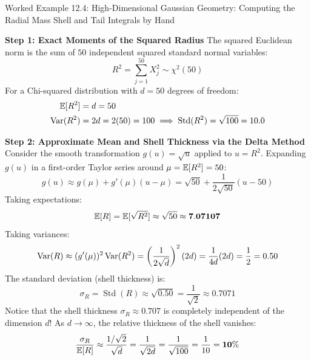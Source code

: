 \begin{examplebox}[breakable]{Worked Example 12.4: High-Dimensional Gaussian Geometry: Computing the Radial Mass Shell and Tail Integrals by Hand}
\tcblower

\textbf{Step 1: Exact Moments of the Squared Radius}
The squared Euclidean norm is the sum of $50$ independent squared standard normal variables:
\begin{equation}
R^2 = \sum_{j=1}^{50} X_j^2 \sim \chi^2(50)
\end{equation}
For a Chi-squared distribution with $d = 50$ degrees of freedom:
\begin{align}
\operatorname{\mathbb{E}}[R^2] &= d = 50 \\
\operatorname{Var}(R^2) &= 2d = 2(50) = 100 \implies \operatorname{Std}(R^2) = \sqrt{100} = 10.0
\end{align}

\textbf{Step 2: Approximate Mean and Shell Thickness via the Delta Method}
Consider the smooth transformation $g(u) = \sqrt{u}$ applied to $u = R^2$.
Expanding $g(u)$ in a first-order Taylor series around $\mu = \operatorname{\mathbb{E}}[R^2] = 50$:
\begin{equation}
g(u) \approx g(\mu) + g'(\mu)(u - \mu) = \sqrt{50} + \frac{1}{2\sqrt{50}}(u - 50)
\end{equation}
Taking expectations:
\begin{equation}
\operatorname{\mathbb{E}}[R] = \operatorname{\mathbb{E}}[\sqrt{R^2}] \approx \sqrt{50} \approx \mathbf{7.07107}
\end{equation}
Taking variances:
\begin{equation}
\operatorname{Var}(R) \approx (g'(\mu))^2 \operatorname{Var}(R^2) = \left( \frac{1}{2\sqrt{d}} \right)^2 (2d) = \frac{1}{4d}(2d) = \frac{1}{2} = 0.50
\end{equation}
The standard deviation (shell thickness) is:
\begin{equation}
\sigma_R = \operatorname{Std}(R) \approx \sqrt{0.50} = \frac{1}{\sqrt{2}} \approx \mathbf{0.7071}
\end{equation}
Notice that the shell thickness $\sigma_R \approx 0.707$ is completely independent of the dimension $d$!
As $d \to \infty$, the relative thickness of the shell vanishes:
\begin{equation}
\frac{\sigma_R}{\operatorname{\mathbb{E}}[R]} \approx \frac{1/\sqrt{2}}{\sqrt{d}} = \frac{1}{\sqrt{2d}} = \frac{1}{\sqrt{100}} = \frac{1}{10} = \mathbf{10\%}
\end{equation}


\end{examplebox}
